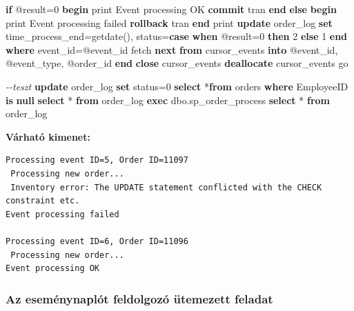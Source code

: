 \documentclass[
  magyar,
]{article}
\newenvironment{Shaded}{}{}
\newcommand{\CommentTok}[1]{\textcolor[rgb]{0.38,0.63,0.69}{\textit{#1}}}
\newcommand{\ControlFlowTok}[1]{\textcolor[rgb]{0.00,0.44,0.13}{\textbf{#1}}}
\newcommand{\DecValTok}[1]{\textcolor[rgb]{0.25,0.63,0.44}{#1}}
\newcommand{\KeywordTok}[1]{\textcolor[rgb]{0.00,0.44,0.13}{\textbf{#1}}}
\newcommand{\NormalTok}[1]{#1}
\newcommand{\OperatorTok}[1]{\textcolor[rgb]{0.40,0.40,0.40}{#1}}
\newcommand{\StringTok}[1]{\textcolor[rgb]{0.25,0.44,0.63}{#1}}
\begin{document}
\begin{Shaded}
\begin{Highlighting}[]
    \ControlFlowTok{if}\NormalTok{ @result}\OperatorTok{=}\DecValTok{0} \ControlFlowTok{begin}
\NormalTok{        print }\StringTok{\textquotesingle{}Event processing OK\textquotesingle{}}
        \KeywordTok{commit}\NormalTok{ tran}
    \ControlFlowTok{end} \ControlFlowTok{else} \ControlFlowTok{begin}
\NormalTok{        print }\StringTok{\textquotesingle{}Event processing failed\textquotesingle{}}
        \KeywordTok{rollback}\NormalTok{ tran}
    \ControlFlowTok{end}
\NormalTok{    print }\StringTok{\textquotesingle{}\textquotesingle{}}
    \KeywordTok{update}\NormalTok{ order\_log }\KeywordTok{set}\NormalTok{ time\_process\_end}\OperatorTok{=}\NormalTok{getdate(),}
\NormalTok{        status}\OperatorTok{=}\ControlFlowTok{case} \ControlFlowTok{when}\NormalTok{ @result}\OperatorTok{=}\DecValTok{0} \ControlFlowTok{then} \DecValTok{2} \ControlFlowTok{else} \DecValTok{1} \ControlFlowTok{end}
        \KeywordTok{where}\NormalTok{ event\_id}\OperatorTok{=}\NormalTok{@event\_id}
\NormalTok{    fetch }\KeywordTok{next} \KeywordTok{from}\NormalTok{ cursor\_events }\KeywordTok{into}\NormalTok{ @event\_id, @event\_type, @order\_id}
\ControlFlowTok{end}
\KeywordTok{close}\NormalTok{ cursor\_events }\KeywordTok{deallocate}\NormalTok{ cursor\_events}
\NormalTok{go}

\CommentTok{{-}{-}teszt}
\KeywordTok{update}\NormalTok{ order\_log }\KeywordTok{set}\NormalTok{ status}\OperatorTok{=}\DecValTok{0}
\KeywordTok{select} \OperatorTok{*}\KeywordTok{from}\NormalTok{ orders }\KeywordTok{where}\NormalTok{ EmployeeID }\KeywordTok{is} \KeywordTok{null}
\KeywordTok{select} \OperatorTok{*} \KeywordTok{from}\NormalTok{ order\_log}
\KeywordTok{exec}\NormalTok{ dbo.sp\_order\_process}
\KeywordTok{select} \OperatorTok{*} \KeywordTok{from}\NormalTok{ order\_log}
\end{Highlighting}
\end{Shaded}

\textbf{Várható kimenet:}

\begin{verbatim}
Processing event ID=5, Order ID=11097
 Processing new order...
 Inventory error: The UPDATE statement conflicted with the CHECK constraint etc.
Event processing failed

Processing event ID=6, Order ID=11096
 Processing new order...
Event processing OK
\end{verbatim}

\subsubsection{Az eseménynaplót feldolgozó ütemezett
feladat}\label{az-esemuxe9nynapluxf3t-feldolgozuxf3-uxfctemezett-feladat}
\end{document}
